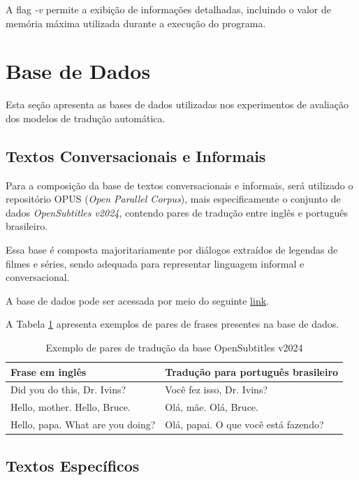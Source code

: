 A flag \textit{-v} permite a exibição de informações detalhadas, incluindo o valor de memória máxima utilizada durante a execução do programa.

\section{Base de Dados}
\label{Database}
Esta seção apresenta as bases de dados utilizadas nos experimentos de avaliação dos modelos de tradução automática.

\subsection{Textos Conversacionais e Informais}

Para a composição da base de textos conversacionais e informais, será utilizado o repositório OPUS (\textit{Open Parallel Corpus}), mais especificamente o conjunto de dados \textit{OpenSubtitles v2024}, contendo pares de tradução entre inglês e português brasileiro.

Essa base é composta majoritariamente por diálogos extraídos de legendas de filmes e séries, sendo adequada para representar linguagem informal e conversacional.

A base de dados pode ser acessada por meio do seguinte \href{https://opus.nlpl.eu/datasets/OpenSubtitles?pair=en&pt-BR}{link}.

A Tabela \ref{tab:OpenSubtitlesv2024} apresenta exemplos de pares de frases presentes na base de dados.

\begin{table}[H]
\centering
\begin{tabular}{ |>{\centering\arraybackslash}p{6cm}|>{\centering\arraybackslash}p{6cm}| }
\hline
\textbf{Frase em inglês} & \textbf{Tradução para português brasileiro} \\
\hline
Did you do this, Dr. Ivins? & Você fez isso, Dr. Ivins? \\
\hline
Hello, mother. Hello, Bruce. & Olá, mãe. Olá, Bruce. \\
\hline
Hello, papa. What are you doing? & Olá, papai. O que você está fazendo? \\
\hline
\end{tabular}
\caption{Exemplo de pares de tradução da base OpenSubtitles v2024}
\label{tab:OpenSubtitlesv2024}
\end{table}

\subsection{Textos Específicos}

